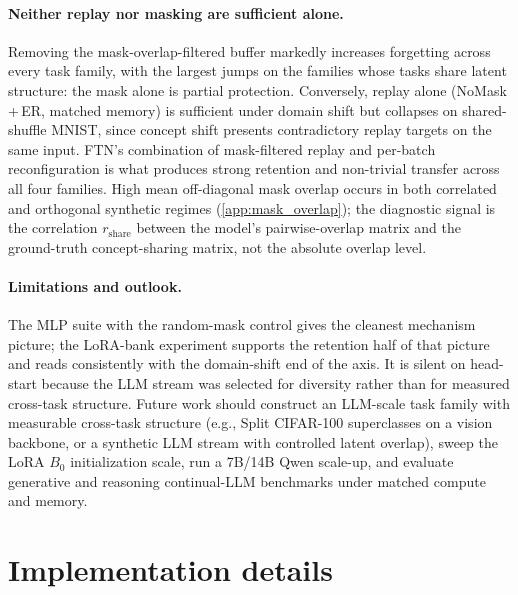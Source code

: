 \documentclass[11pt]{article}
\begin{document}
\paragraph{Neither replay nor masking are sufficient alone.}
Removing the mask-overlap-filtered buffer markedly increases forgetting across every task family, with the largest jumps on the families whose tasks share latent structure: the mask alone is partial protection. Conversely, replay alone (NoMask\,+\,ER, matched memory) is sufficient under domain shift but collapses on shared-shuffle MNIST, since concept shift presents contradictory replay targets on the same input. FTN's combination of mask-filtered replay and per-batch reconfiguration is what produces strong retention and non-trivial transfer across all four families. High mean off-diagonal mask overlap occurs in both correlated and orthogonal synthetic regimes (\cref{app:mask_overlap}); the diagnostic signal is the correlation $r_{\mathrm{share}}$ between the model's pairwise-overlap matrix and the ground-truth concept-sharing matrix, not the absolute overlap level.

\paragraph{Limitations and outlook.}
The MLP suite with the random-mask control gives the cleanest mechanism picture; the LoRA-bank experiment supports the retention half of that picture and reads consistently with the domain-shift end of the axis. It is silent on head-start because the LLM stream was selected for diversity rather than for measured cross-task structure. Future work should construct an LLM-scale task family with measurable cross-task structure (e.g., Split CIFAR-100 superclasses on a vision backbone, or a synthetic LLM stream with controlled latent overlap), sweep the LoRA $B_0$ initialization scale, run a 7B/14B Qwen scale-up, and evaluate generative and reasoning continual-LLM benchmarks under matched compute and memory.





\newpage
\appendix

\section{Implementation details}\label{app:impl}
\end{document}

